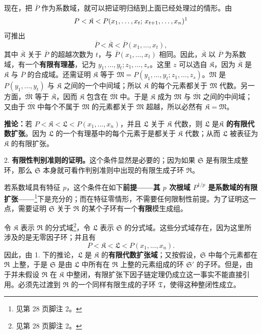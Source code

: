 \documentclass[11pt]{article}
\newcommand{\srcemph}[1]{\textbf{#1}}
\begin{document}
现在，把 $\overline P$ 作为系数域，就可以把证明归结到上面已经处理过的情形。由
\[
 P<\mathfrak K<P(x_1,\ldots,x_t;\,x_{t+1},\ldots,x_n)\text{\footnotemark}
\]
可推出
\[
 \overline P<\overline{\mathfrak K}<\overline P(x_1,\ldots,x_t),
\]
其中 $\overline{\mathfrak K}$ 关于 $\overline P$ 的超越次数为 $t$，与 $\overline P(x_1,\ldots,x_t)$ 相同。因此，$\overline{\mathfrak K}$ 以 $\overline P$ 为系数域，有一个\srcemph{有限有理基}，记为 $y_1,\ldots,y_t; z_1,\ldots,z_s$。这里 $z$ 可以选自 $\mathfrak K$，因为 $\overline{\mathfrak K}$ 是 $\mathfrak K$ 与 $\overline P$ 的合成域。还需证明 $\mathfrak K$ 等于 $\mathfrak M=P(y_1,\ldots,y_t;z_1,\ldots,z_s)$。$\mathfrak M$ 是 $P(y_1,\ldots,y_t)$ 与 $\mathfrak K$ 之间的一个中间域；所以 $\mathfrak K$ 的每个元素都关于 $\mathfrak M$ 代数。另一方面，$\overline{\mathfrak M}$ 等于 $\overline{\mathfrak K}$，因而 $\mathfrak K$ 包含在 $\overline{\mathfrak M}$ 中。于是 $\mathfrak K$ 成为 $\mathfrak M$ 与 $\overline{\mathfrak M}$ 之间的中间域；又由于 $\overline{\mathfrak M}$ 中每个不属于 $\mathfrak M$ 的元素都关于 $\mathfrak M$ 超越，所以必然有 $\mathfrak K=\mathfrak M$。

\srcemph{推论：}若 $P<\mathfrak K<\mathfrak L<P(x_1,\ldots,x_n)$，并且 $\mathfrak L$ 关于 $\mathfrak K$ 代数，则 $\mathfrak L$ 是\srcemph{$\mathfrak K$ 的有限代数扩张}。因为 $\mathfrak L$ 的一个有理基中的每个元素于是都关于 $\mathfrak K$ 代数；从而 $\mathfrak L$ 被表征为 $\mathfrak K$ 的有限扩张。

2. \srcemph{有限性判别准则的证明。}这个条件显然是必要的；因为如果 $\mathfrak S$ 是有限生成整环，那么 $\mathfrak S$ 本身就可看作判别准则中出现的有限生成子环 $\mathfrak R$。

若系数域具有特征 $p$，这个条件在如下\srcemph{前提——其 $p$ 次根域 $P^{1/p}$ 是系数域的有限扩张——}\footnote{见第 28 页脚注 2。}下是充分的；而在特征零情形，不需要任何限制性前提。为了证明这一点，需要证明 $\mathfrak S$ 关于 $\mathfrak R$ 的某个子环有一个\srcemph{有限}模生成组。

令 $\mathfrak K$ 表示 $\mathfrak R$ 的分式域\footnote{见第 28 页脚注 2。}，令 $\mathfrak L$ 表示 $\mathfrak S$ 的分式域。这些分式域存在，因为这里所涉及的是无零因子环；并且有
\[
 P<\mathfrak K<\mathfrak L<P(x_1,\ldots,x_n).
\]
因此，由 1. 下的推论，$\mathfrak L$ 是 $\mathfrak K$ 的\srcemph{有限代数扩张域}；又按假设，$\mathfrak S$ 中每个元素都在 $\mathfrak R$ 上整，于是 $\mathfrak S$ 是由 $\mathfrak L$ 中所有在 $\mathfrak R$ 上整的元素组成的环 $\mathfrak S'$ 的子环。但是，由于并未假设 $\mathfrak R$ 在 $\mathfrak K$ 中整闭，有限扩张下因子链定理仍成立这一事实不能直接引用。必须先过渡到 $\mathfrak R$ 的一个同样有限生成的子环 $\mathfrak T$，使得这种整闭性成立。
\end{document}
